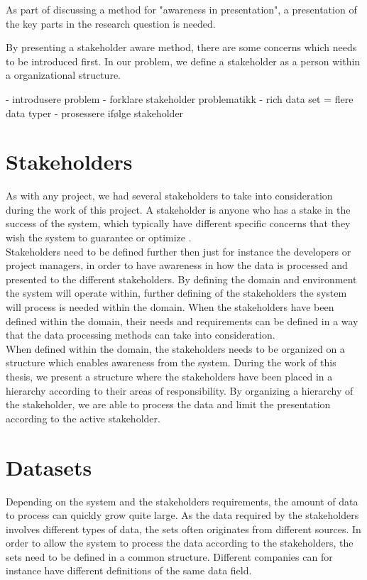 As part of discussing a method for "awareness in presentation", a presentation
of the key parts in the research question is needed. 

By presenting a stakeholder aware method, there are some concerns which needs
to be introduced first. In our problem, we define a stakeholder as a person
within a organizational structure. 

- introdusere problem
- forklare stakeholder problematikk
- rich data set = flere data typer
- prosessere ifølge stakeholder


\section{Stakeholders} %
\label{sec:intro_stakeholders}  
As with any project, we had several stakeholders to take into consideration
during the work of this project. A stakeholder is anyone who has a stake in 
the success of the system, which typically have different specific concerns 
that they wish the system to guarantee or optimize 
\cite{Bass:2012:SAP:2392670}.\\

Stakeholders need to be defined further then just for instance the developers
or project managers, in order to have awareness in how the data is processed 
and presented to the different stakeholders. 
By defining the domain and environment the system will
operate within, further defining of the stakeholders the system will process 
is needed within the domain. When the stakeholders have been defined within 
the domain, their needs and requirements can be defined in a way that the data 
processing methods can take into consideration. \\

When defined within the domain, the stakeholders needs to be organized on a 
structure which enables awareness from the system. During the work of this 
thesis, we present a structure where the stakeholders have been placed in a 
hierarchy according to their areas of responsibility. By organizing a 
hierarchy of the stakeholder, we are able to process the data and limit the 
presentation according to the active stakeholder. 

\section{Datasets} %
\label{sec:intro_data_sets}
Depending on the system and the stakeholders requirements, the amount of data
to process can quickly grow quite large. As the data required by the
stakeholders involves different types of data, the sets often originates from
different sources. In order to allow the system to process the data according
to the stakeholders, the sets need to be defined in a common structure.
Different companies can for instance have different definitions of the same
data field.


